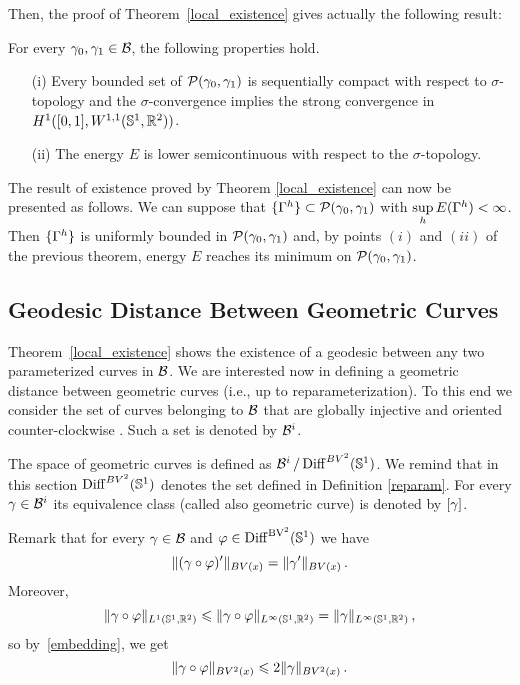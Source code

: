 Then, the proof of Theorem~\ref{local_existence} gives actually the following result:


\begin{thm}\label{comp-sigma} For every  $\gamma_0,\gamma_1\in\mathcal{B}$, the following properties hold.
\begin{itemize}
\item[(i)] Every bounded set of $\mathcal{P}(\gamma_0,\gamma_1)$ is sequentially compact with respect to $\sigma$-topology and the $\sigma$-convergence implies the strong convergence in $H^1([0,1], W^{1,1}(\mathbb{S}^1,\mathbb{R}^2))$.
\item[(ii)] The energy $E$ is lower semicontinuous with respect to the $\sigma$-topology.
\end{itemize}
\end{thm}


\begin{rem}\label{existence-sigma}
The result of existence proved by Theorem \ref{local_existence} can  now be presented as follows. We can suppose that  $\{\Gamma^h\} \subset\mathcal{P}(\gamma_0,\gamma_1) $ with  $\underset{h}{\sup}\, E(\Gamma^h)< \infty$. 
Then $\{\Gamma^h\}$ is uniformly bounded in  $\mathcal{P}(\gamma_0,\gamma_1)$ and, by points $(i)$ and $(ii)$ of the previous theorem, energy $E$ reaches its minimum on  $\mathcal{P}(\gamma_0,\gamma_1)$.
\end{rem}


\subsection{Geodesic Distance Between Geometric Curves}
\label{13}

Theorem~\ref{local_existence} shows the existence of a geodesic between any two parameterized curves in $\mathcal{B}$. We are interested now in defining a geometric distance between geometric curves (i.e., up to reparameterization). To this end we consider the set of curves belonging to $\mathcal{B}$ that are globally injective and oriented counter-clockwise . Such a set is denoted by $\mathcal{B}^i$.

 The space of geometric curves is defined as $\mathcal{B}^i \, / \, {\rm Diff}^{BV^2}(\mathbb{S}^1)$. We remind that in this section ${\rm Diff}^{BV^2}(\mathbb{S}^1)$ denotes the set defined in Definition \ref{reparam}. For every $\gamma\in \mathcal{B}^i$ its equivalence class (called also  geometric curve) is denoted by $[\gamma]$.

\begin{simplified}
\begin{rem}
 Remark that  for every $\gamma\in \mathcal{B}$ and $\varphi \in \rm{Diff}^{BV^2}(\mathbb{S}^1)$ we have 
$$
\|(\gamma\circ \varphi)'\|_{BV(x)}=\|\gamma'\|_{BV(x)} \,.
$$
Moreover, 
 $$\|\gamma\circ \varphi\|_{L^1(\mathbb{S}^1,\mathbb{R}^2)}\leqslant \|\gamma\circ\varphi\|_{L^\infty(\mathbb{S}^1,\mathbb{R}^2)} = \|\gamma\|_{L^\infty(\mathbb{S}^1,\mathbb{R}^2)}\,,$$ 
 so by~\eqref{embedding}, we get
\begin{equation}\label{reparamet}
\|\gamma\circ \varphi\|_{BV^2(x)}\leqslant 2\|\gamma\|_{BV^2(x)} \,.
\end{equation}
\end{rem}
\end{simplified}

